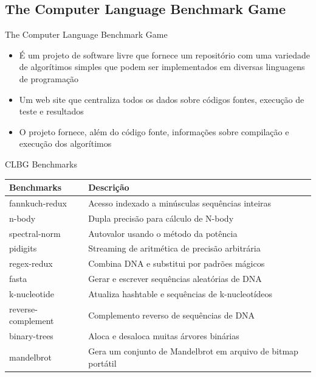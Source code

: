 \subsection{The Computer Language Benchmark Game}
\begin{frame}{The Computer Language Benchmark Game}
    \begin{itemize}
        \item É um projeto de software livre que fornece um repositório com uma variedade de algorítimos simples que podem ser implementados em diversas linguagens de programação
        \item Um web site que centraliza todos os dados sobre códigos fontes, execução de teste e resultados
        \item O projeto fornece, além do código fonte, informações sobre compilação e execução dos algorítimos
    \end{itemize}
\end{frame}
\begin{frame}{CLBG Benchmarks}
	\centering
	
	\label{tbl:clbg_benchmarks}
	\begin{table}[h]

        \begin{tabular}{l|l}
        \textbf{Benchmarks} & \textbf{Descrição}   \\
        \hline
		fannkuch-redux      & Acesso indexado a minúsculas sequências inteiras            \\
		\hline
        n-body              & Dupla precisão para cálculo de N-body                       \\
		\hline
        spectral-norm       & Autovalor usando o método da potência                       \\
		\hline
        pidigits            & Streaming de aritmética de precisão arbitrária             \\
		\hline
        regex-redux         & Combina DNA e substitui por padrões mágicos                 \\
		\hline
        fasta               & Gerar e escrever sequências aleatórias de DNA               \\
		\hline
        k-nucleotide        & Atualiza hashtable e sequências de k-nucleotídeos           \\
		\hline
        reverse-complement  & Complemento reverso de sequências de DNA                     \\
		\hline
        binary-trees        & Aloca e desaloca muitas árvores binárias                    \\
		\hline
        mandelbrot          & Gera um conjunto de Mandelbrot em arquivo de bitmap portátil \\
    \end{tabular}
	\end{table}
\end{frame}

